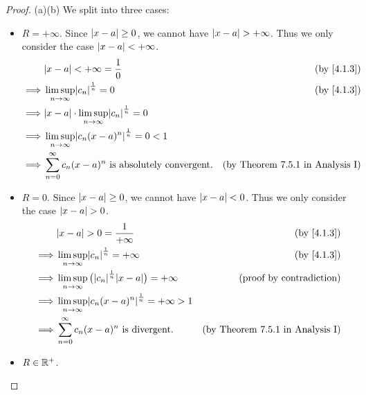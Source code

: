 \begin{proof}{(a)}{(b)}
  We split into three cases:
  \begin{itemize}
    \item \(R = +\infty\).
          Since \(\left\lvert x - a\right\rvert \geq 0\), we cannot have \(\left\lvert x - a\right\rvert > +\infty\).
          Thus we only consider the case \(\left\lvert x - a\right\rvert < +\infty\).
          \begin{align*}
                     & \abs{x - a} < +\infty = \frac{1}{0}                                  & \text{(by \cref{4.1.3})}                \\
            \implies & \limsup_{n \to \infty} \abs{c_n}^{\frac{1}{n}} = 0                   & \text{(by \cref{4.1.3})}                \\
            \implies & \abs{x - a} \cdot \limsup_{n \to \infty} \abs{c_n}^{\frac{1}{n}} = 0                                           \\
            \implies & \limsup_{n \to \infty} \abs{c_n (x - a)^n}^{\frac{1}{n}} = 0 < 1                                               \\
            \implies & \sum_{n = 0}^\infty c_n (x - a)^n \text{ is absolutely convergent}.  & \text{(by Theorem 7.5.1 in Analysis I)}
          \end{align*}
    \item \(R = 0\).
          Since \(\left\lvert x - a\right\rvert \geq 0\), we cannot have \(\left\lvert x - a\right\rvert < 0\).
          Thus we only consider the case \(\left\lvert x - a\right\rvert > 0\).
          \begin{align*}
                     & \abs{x - a} > 0 = \frac{1}{+\infty}                                            & \text{(by \cref{4.1.3})}                \\
            \implies & \limsup_{n \to \infty} \abs{c_n}^{\frac{1}{n}} = +\infty                       & \text{(by \cref{4.1.3})}                \\
            \implies & \limsup_{n \to \infty} \big(\abs{c_n}^{\frac{1}{n}} \abs{x - a}\big) = +\infty & \text{(proof by contradiction)}         \\
            \implies & \limsup_{n \to \infty} \abs{c_n (x - a)^n}^{\frac{1}{n}} = +\infty > 1                                                   \\
            \implies & \sum_{n = 0}^\infty c_n (x - a)^n \text{ is divergent}.                        & \text{(by Theorem 7.5.1 in Analysis I)}
          \end{align*}
    \item \(R \in \mathbb{R}^+\).

\end{itemize}
\end{proof}
